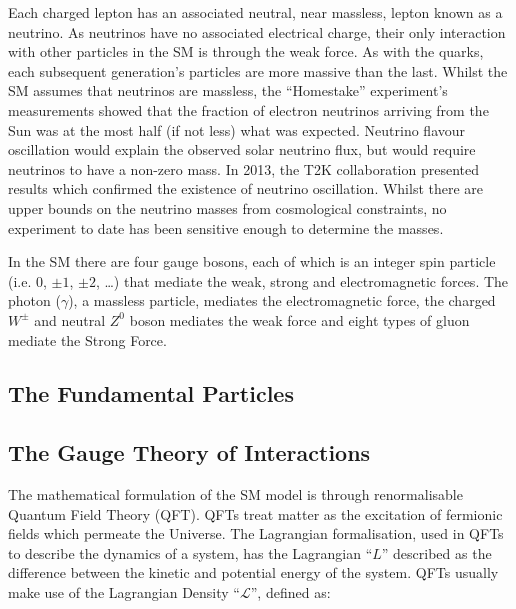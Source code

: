 Each charged lepton has an associated neutral, near massless, lepton known as a neutrino. 
As neutrinos have no associated electrical charge, their only interaction with other particles in the SM is through the weak force. 
As with the quarks, each subsequent generation's particles are more massive than the last. 
Whilst the SM assumes that neutrinos are massless, the ``Homestake'' experiment's measurements showed that the fraction of electron neutrinos arriving from the Sun was at the most half (if not less) what was expected\cite{PhysRevLett.20.1205}. 
Neutrino flavour oscillation would explain the observed solar neutrino flux, but would require neutrinos to have a non-zero mass. 
In 2013, the T2K collaboration presented results which confirmed the existence of neutrino oscillation\cite{PhysRevD.88.032002}. 
Whilst there are upper bounds on the neutrino masses from cosmological constraints, no experiment to date has been sensitive enough to determine the masses\cite{1475-7516-2006-06-019}. 

In the SM there are four gauge bosons, each of which is an integer spin particle (i.e. 0, $\pm 1$, $\pm 2$, …) that mediate the weak, strong and electromagnetic forces. 
The photon ($\gamma$), a massless particle, mediates the electromagnetic force, the charged $W^\pm$ and neutral $Z^0$ boson mediates the weak force and eight types of gluon mediate the Strong Force\cite{LagrangiansSM}. 

\subsection{The Fundamental Particles}\label{subsec:particles}



\subsection{The Gauge Theory of Interactions}\label{subsec:gauges}

The mathematical formulation of the SM model is through renormalisable Quantum Field Theory (QFT)\cite{LagrangiansSM}. 
QFTs treat matter as the excitation of fermionic fields which permeate the Universe. 
The Lagrangian formalisation, used in QFTs to describe the dynamics of a system, has the Lagrangian ``$L$'' described as the difference between the kinetic and potential energy of the system\cite{LagrangiansSM}. 
QFTs usually make use of the Lagrangian Density ``$\mathcal{L}$'', defined as\cite{QFT}:

